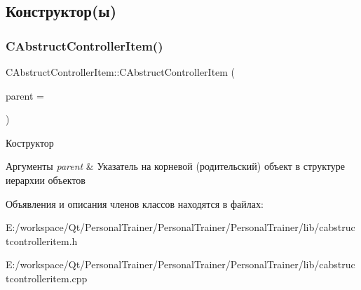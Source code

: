 \subsection{Конструктор(ы)}
\hypertarget{class_c_abstruct_controller_item_a1d99654a9522cc8721a329d1dcee35a4}{}\label{class_c_abstruct_controller_item_a1d99654a9522cc8721a329d1dcee35a4} 
\subsubsection{\texorpdfstring{C\+Abstruct\+Controller\+Item()}{CAbstructControllerItem()}}
{\footnotesize\ttfamily C\+Abstruct\+Controller\+Item\+::\+C\+Abstruct\+Controller\+Item (\begin{DoxyParamCaption}\item[{Q\+Object $\ast$}]{parent = {} }\end{DoxyParamCaption})\hspace{0.3cm}{\ttfamily [explicit]}}



Коструктор 


\begin{DoxyParams}{Аргументы}
{\em parent} & Указатель на корневой (родительский) объект в структуре иерархии объектов \\
\hline
\end{DoxyParams}


Объявления и описания членов классов находятся в файлах\+:\begin{DoxyCompactItemize}
\item 
E\+:/workspace/\+Qt/\+Personal\+Trainer/\+Personal\+Trainer/\+Personal\+Trainer/lib/cabstructcontrolleritem.\+h\item 
E\+:/workspace/\+Qt/\+Personal\+Trainer/\+Personal\+Trainer/\+Personal\+Trainer/lib/cabstructcontrolleritem.\+cpp\end{DoxyCompactItemize}

